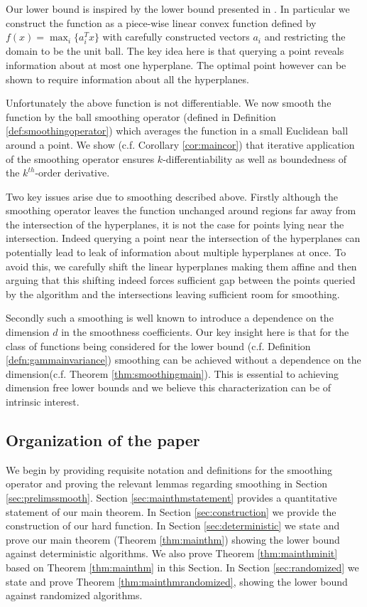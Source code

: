 \documentclass[final,12pt]{colt2018} %
\begin{document}
Our lower bound is inspired by the lower bound presented in \cite{ClarksonHW2012}. In particular we construct the function as a piece-wise linear convex function defined by $f(x) = \max_i \{ a_i^Tx \}$ with carefully constructed vectors $a_i$ and restricting the domain to be the unit ball. The key idea here is that querying a point reveals information about at most one hyperplane. The optimal point however can be shown to require information about all the hyperplanes.

Unfortunately the above function is not differentiable. We now smooth the function by the ball smoothing operator (defined in Definition \ref{def:smoothingoperator}) which averages the function in a small Euclidean ball around a point. We show (c.f. Corollary \ref{cor:maincor}) that iterative application of the smoothing operator ensures $k$-differentiability as well as boundedness of the $k^{th}$-order derivative.

Two key issues arise due to smoothing described above. Firstly although the smoothing operator leaves the function unchanged around regions far away from the intersection of the hyperplanes, it is not the case for points lying near the intersection. Indeed querying a point near the intersection of the hyperplanes can potentially lead to leak of information about multiple hyperplanes at once. To avoid this, we carefully shift the linear hyperplanes making them affine and then arguing that this shifting indeed forces sufficient gap between the points queried by the algorithm and the intersections leaving sufficient room for smoothing. 

Secondly such a smoothing is well known to introduce a dependence on the dimension $d$ in the smoothness coefficients. Our key insight here is that for the class of functions being considered for the lower bound (c.f. Definition \ref{defn:gammainvariance}) smoothing can be achieved without a dependence on the dimension(c.f. Theorem \ref{thm:smoothingmain}). This is essential to achieving dimension free lower bounds and we believe this characterization can be of intrinsic interest.

\subsection{Organization of the paper}

We begin by providing requisite notation and definitions for the smoothing operator and proving the relevant lemmas regarding smoothing in Section \ref{sec:prelimssmooth}. Section \ref{sec:mainthmstatement} provides a quantitative statement of our main theorem. In Section \ref{sec:construction} we provide the construction of our hard function. In Section \ref{sec:deterministic} we state and prove our main theorem (Theorem \ref{thm:mainthm}) showing the lower bound against deterministic algorithms. We also prove Theorem \ref{thm:mainthminit} based on Theorem \ref{thm:mainthm} in this Section. In Section \ref{sec:randomized} we state and prove Theorem \ref{thm:mainthmrandomized}, showing the lower bound against randomized algorithms.
\end{document}
